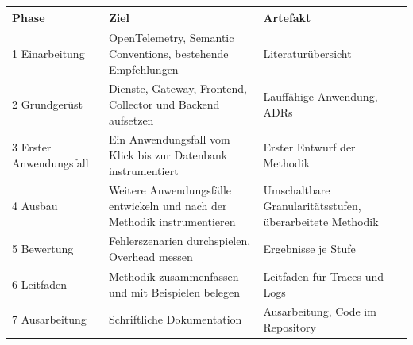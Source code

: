 \documentclass[11pt, a4paper]{article}
\begin{document}
\begin{center}
\small
\begin{tabularx}{\textwidth}{@{}l X X@{}}
\toprule
\textbf{Phase} & \textbf{Ziel} & \textbf{Artefakt} \\
\midrule
1 Einarbeitung & OpenTelemetry, Semantic Conventions, bestehende Empfehlungen & Literaturübersicht \\
2 Grundgerüst & Dienste, Gateway, Frontend, Collector und Backend aufsetzen & Lauffähige Anwendung, ADRs \\
3 Erster Anwendungsfall & Ein Anwendungsfall vom Klick bis zur Datenbank instrumentiert & Erster Entwurf der Methodik \\
4 Ausbau & Weitere Anwendungsfälle entwickeln und nach der Methodik instrumentieren & Umschaltbare Granularitätsstufen, überarbeitete Methodik \\
5 Bewertung & Fehlerszenarien durchspielen, Overhead messen & Ergebnisse je Stufe \\
6 Leitfaden & Methodik zusammenfassen und mit Beispielen belegen & Leitfaden für Traces und Logs \\
7 Ausarbeitung & Schriftliche Dokumentation & Ausarbeitung, Code im Repository \\
\bottomrule
\end{tabularx}
\end{center}

\printbibliography[heading=bibintoc, title={Literaturverzeichnis}]
\end{document}
